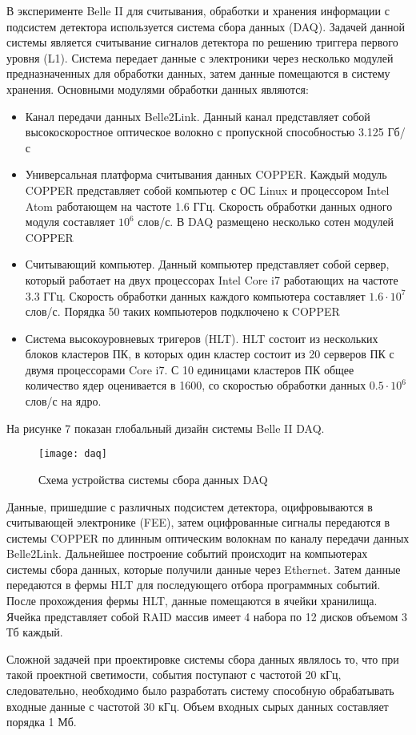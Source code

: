 В эксперименте Belle II для считывания, обработки и хранения информации с подсистем детектора используется система сбора данных (DAQ). Задачей данной системы является считывание сигналов детектора по решению триггера первого уровня (L1). Система передает данные с электроники через несколько модулей предназначенных для обработки данных, затем данные помещаются в систему хранения. Основными модулями обработки данных являются:
\begin{itemize}
  \item Канал передачи данных Belle2Link. Данный канал представляет собой высокоскоростное оптическое волокно с пропускной способностью 3.125 Гб/с
  \item Универсальная платформа считывания данных COPPER. Каждый модуль COPPER представляет собой компьютер с ОС Linux и процессором Intel Atom работающем на частоте 1.6 ГГц. Скорость обработки данных одного модуля составляет $10^6$ слов/с. В DAQ размещено несколько сотен модулей COPPER
  \item Считывающий компьютер. Данный компьютер представляет собой сервер, который  работает на двух процессорах Intel Core i7 работающих на частоте 3.3 ГГц. Скорость обработки данных каждого компьютера составляет $1.6\cdot10^7$ слов/с. Порядка 50 таких компьютеров подключено к COPPER
  \item Система высокоуровневых тригеров (HLT). HLT состоит из нескольких блоков кластеров ПК, в которых один кластер состоит из 20 серверов ПК с двумя процессорами Core i7. С 10 единицами кластеров ПК общее количество ядер оценивается в 1600, со скоростью обработки данных $0.5\cdot10^6$ слов/с на ядро.
\end{itemize}
На рисунке 7 показан глобальный дизайн системы Belle II DAQ. 
\begin{figure}[htp]
  \centering
  \texttt{[image: daq]}
  \caption{Схема устройства системы сбора данных DAQ}
  \label{fig:galaxy}
\end{figure}
Данные, пришедшие с различных подсистем детектора, оцифровываются в считывающей электронике (FEE), затем оцифрованные сигналы передаются в системы COPPER по длинным оптическим волокнам по каналу передачи данных Belle2Link. Дальнейшее построение событий происходит на компьютерах системы сбора данных, которые получили данные через Ethernet. Затем данные передаются в фермы HLT для последующего отбора программных событий. После прохождения фермы HLT, данные помещаются в ячейки хранилища. Ячейка представляет собой RAID массив имеет 4 набора по 12 дисков объемом 3 Тб каждый. \par
  Сложной задачей при проектировке системы сбора данных являлось то, что при такой проектной светимости, события поступают с частотой 20 кГц, следовательно, необходимо было разработать систему способную обрабатывать входные данные с частотой 30 кГц. Объем входных сырых данных составляет порядка 1 Мб.
